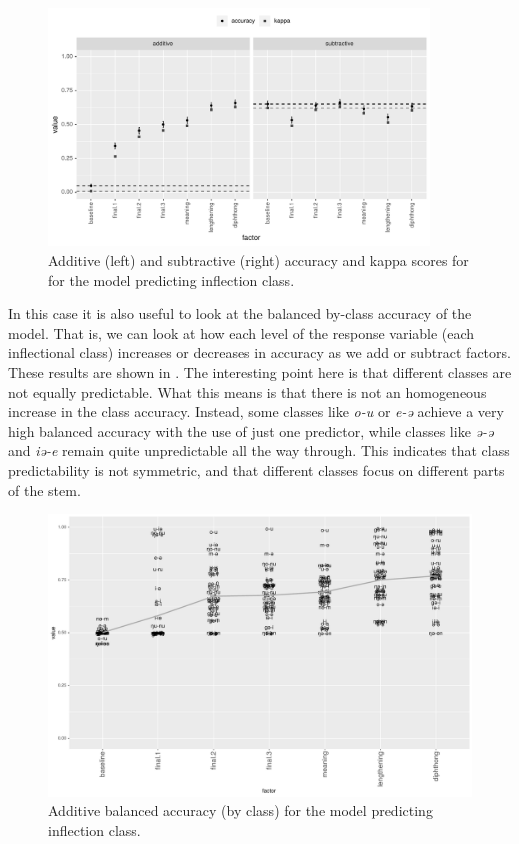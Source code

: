 \begin{figure}
  \centering
  \includegraphics[width=0.9\textwidth]{./figures/kasem/p-fi-class-sg-overall.pdf}
    \caption{Additive (left) and subtractive (right) accuracy and kappa scores for for the model predicting inflection class.}\label{fig:overall-fi-class-sg}
\end{figure}

In this case it is also useful to look at the balanced by-class accuracy of the model. That is, we can look at how each level of the response variable (each inflectional class) increases or decreases in accuracy as we add or subtract factors. These results are shown in . The interesting point here is that different classes are not equally predictable. What this means is that there is not an homogeneous increase in the class accuracy. Instead, some classes like \textit{o-u} or \textit{e-ə} achieve a very high balanced accuracy with the use of just one predictor, while classes like \textit{ə-ə} and \textit{iə-e} remain quite unpredictable all the way through. This indicates that class predictability is not symmetric, and that different classes focus on different parts of the stem.

\begin{figure}
  \centering
  \includegraphics[width=0.85\textheight]{./figures/kasem/p-fi-class-sg-byclass.pdf}
  \caption{Additive balanced accuracy (by class) for the model predicting inflection class.}\label{fig:byclass-fi-class-sg}
\end{figure}

